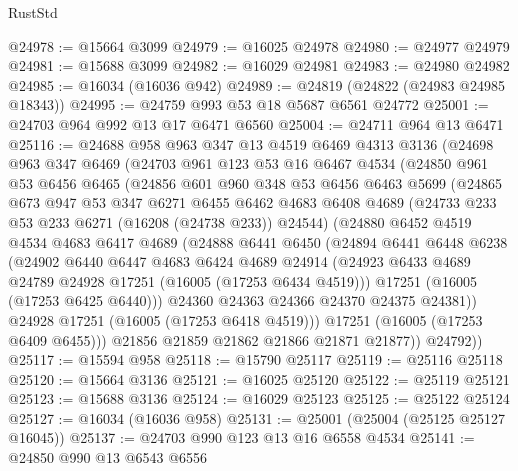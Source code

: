 \begin{lexlean}{RustStd}
\begin{coremodule}
@24978 := @15664 @3099
@24979 := @16025 @24978
@24980 := @24977 @24979
@24981 := @15688 @3099
@24982 := @16029 @24981
@24983 := @24980 @24982
@24985 := @16034 (@16036 @942)
@24989 := @24819 (@24822 (@24983 @24985 @18343))
@24995 := @24759 @993 @53 @18 @5687 @6561 @24772
@25001 := @24703 @964 @992 @13 @17 @6471 @6560
@25004 := @24711 @964 @13 @6471
@25116 := @24688
    @958
    @963
    @347
    @13
    @4519
    @6469
    @4313
    @3136
    (@24698
      @963
      @347
      @6469
      (@24703
        @961
        @123
        @53
        @16
        @6467
        @4534
        (@24850
          @961
          @53
          @6456
          @6465
          (@24856
            @601
            @960
            @348
            @53
            @6456
            @6463
            @5699
            (@24865
              @673
              @947
              @53
              @347
              @6271
              @6455
              @6462
              @4683
              @6408
              @4689
              (@24733 @233 @53 @233 @6271 (@16208 (@24738 @233)) @24544)
              (@24880
                @6452
                @4519
                @4534
                @4683
                @6417
                @4689
                (@24888
                  @6441
                  @6450
                  (@24894
                    @6441
                    @6448
                    @6238
                    (@24902
                      @6440
                      @6447
                      @4683
                      @6424
                      @4689
                      @24914
                      (@24923 @6433 @4689 @24789 @24928 @17251 (@16005 (@17253 @6434 @4519)))
                      @17251
                      (@16005 (@17253 @6425 @6440)))
                    @24360
                    @24363
                    @24366
                    @24370
                    @24375
                    @24381))
                @24928
                @17251
                (@16005 (@17253 @6418 @4519)))
              @17251
              (@16005 (@17253 @6409 @6455)))
            @21856
            @21859
            @21862
            @21866
            @21871
            @21877))
        @24792))
@25117 := @15594 @958
@25118 := @15790 @25117
@25119 := @25116 @25118
@25120 := @15664 @3136
@25121 := @16025 @25120
@25122 := @25119 @25121
@25123 := @15688 @3136
@25124 := @16029 @25123
@25125 := @25122 @25124
@25127 := @16034 (@16036 @958)
@25131 := @25001 (@25004 (@25125 @25127 @16045))
@25137 := @24703 @990 @123 @13 @16 @6558 @4534
@25141 := @24850 @990 @13 @6543 @6556

\end{coremodule}
\end{lexlean}
